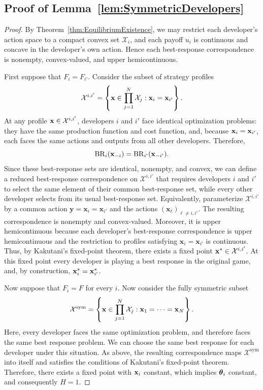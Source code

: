 \subsection{Proof of Lemma~\ref{lem:SymmetricDevelopers}}
\label{app:SymmetricDevelopers_proof}
\SymmetricDevelopers*
\begin{proof}
By Theorem~\ref{thm:EquilibriumExistence}, we may restrict each developer's action space to a compact convex set $\mathcal{X}_i$, and each payoff $u_i$ is continuous and concave in the developer's own action. Hence each best-response correspondence is nonempty, convex-valued, and upper hemicontinuous.

First suppose that $F_i=F_{i'}$. Consider the subset of strategy profiles
\[
\mathcal{X}^{i,i'}
=
\left\{
\mathbf{x} \in\prod_{j=1}^N\mathcal{X}_j:
\mathbf{x}_i =\mathbf{x}_{i'}
\right\}.
\]
At any profile $\mathbf{x} \in\mathcal{X}^{i,i'}$, developers $i$ and $i'$ face identical optimization problems: they have the same production function and cost function, and, because $\mathbf{x}_i=\mathbf{x}_{i'}$, each faces the same actions and outputs from all other developers. Therefore,
\[
\mathrm{BR}_i(\mathbf{x}_{-i})
=
\mathrm{BR}_{i'}(\mathbf{x}_{-i'}).
\]
Since these best-response sets are identical, nonempty, and convex, we can define a reduced best-response correspondence on $\mathcal{X}^{i,i'}$ that requires developers $i$ and $i'$ to select the same element of their common best-response set, while every other developer selects from its usual best-response set. 
Equivalently, parameterize $\mathcal{X}^{i,i'}$ by a common action $\mathbf y=\mathbf x_i=\mathbf x_{i'}$ and the actions $(\mathbf x_\ell)_{\ell\neq i,i'}$. 
The resulting correspondence is nonempty and convex-valued. 
Moreover, it is upper hemicontinuous because each developer's best-response correspondence is upper hemicontinuous and the restriction to profiles satisfying $\mathbf x_i=\mathbf x_{i'}$ is continuous.
Thus, by Kakutani's fixed-point theorem, there exists a fixed point $\mathbf{x}^*\in\mathcal{X}^{i,i'}$.
At this fixed point every developer is playing a best response in the original game, and, by construction, $\mathbf{x}_i^*=\mathbf{x}_{i'}^*$.

Now suppose that $F_i=F$ for every $i$. 
Now consider the fully symmetric subset
\[
\mathcal{X}^{\mathrm{sym}}
=
\left\{
\mathbf{x}\in\prod_{j=1}^N\mathcal{X}_j:
\mathbf{x}_1=\cdots=\mathbf{x}_N
\right\}.
\]
Here, every developer faces the same optimization problem, and therefore faces the same best response problem. 
We can choose the same best response for each developer under this situation. 
As above, the resulting correspondence maps $\mathcal{X}^{\mathrm{sym}}$ into itself and satisfies the conditions of Kakutani's fixed-point theorem.
Therefore, there exists a fixed point with $\mathbf{x}_i$ constant, which implies $\boldsymbol{\theta}_i$ constant, and consequently $H=1$.
\end{proof}

